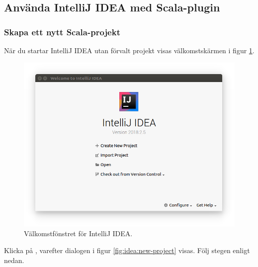 \subsection{Använda IntelliJ IDEA med Scala-plugin}%

\subsubsection{Skapa ett nytt Scala-projekt}

När du startar IntelliJ IDEA utan förvalt projekt visas välkomstskärmen i figur \ref{fig:idea:welcome}.
\begin{figure}[h]
\centering
\includegraphics[width=1.0\textwidth]{../img/intellij/idea-welcome.png}
\caption{Välkomstfönstret för IntelliJ IDEA. \label{fig:idea:welcome}}
\end{figure}

\noindent Klicka på , varefter dialogen i figur \ref{fig:idea:new-project} visas. Följ stegen enligt nedan.


